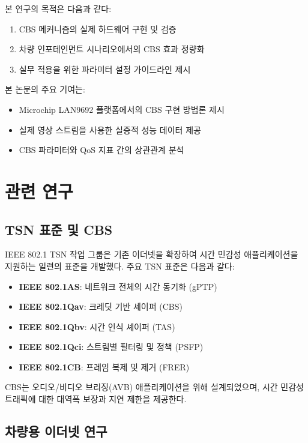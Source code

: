 \documentclass[10pt,twocolumn]{IEEEtran}
\begin{document}
본 연구의 목적은 다음과 같다:

\begin{enumerate}
\item CBS 메커니즘의 실제 하드웨어 구현 및 검증
\item 차량 인포테인먼트 시나리오에서의 CBS 효과 정량화
\item 실무 적용을 위한 파라미터 설정 가이드라인 제시
\end{enumerate}

본 논문의 주요 기여는:
\begin{itemize}
\item Microchip LAN9692 플랫폼에서의 CBS 구현 방법론 제시
\item 실제 영상 스트림을 사용한 실증적 성능 데이터 제공
\item CBS 파라미터와 QoS 지표 간의 상관관계 분석
\end{itemize}

\section{관련 연구}

\subsection{TSN 표준 및 CBS}

IEEE 802.1 TSN 작업 그룹은 기존 이더넷을 확장하여 시간 민감성 애플리케이션을 지원하는 일련의 표준을 개발했다. 주요 TSN 표준은 다음과 같다:

\begin{itemize}
\item \textbf{IEEE 802.1AS}: 네트워크 전체의 시간 동기화 (gPTP)
\item \textbf{IEEE 802.1Qav}: 크레딧 기반 셰이퍼 (CBS)
\item \textbf{IEEE 802.1Qbv}: 시간 인식 셰이퍼 (TAS)
\item \textbf{IEEE 802.1Qci}: 스트림별 필터링 및 정책 (PSFP)
\item \textbf{IEEE 802.1CB}: 프레임 복제 및 제거 (FRER)
\end{itemize}

CBS는 오디오/비디오 브리징(AVB) 애플리케이션을 위해 설계되었으며, 시간 민감성 트래픽에 대한 대역폭 보장과 지연 제한을 제공한다\cite{avb_standard2011}.

\subsection{차량용 이더넷 연구}
\end{document}

